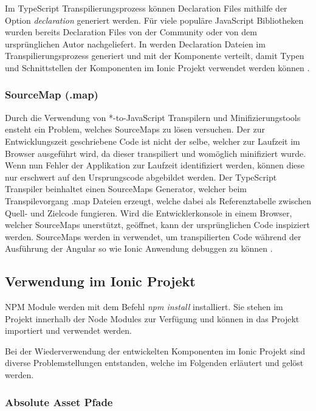 Im TypeScript Transpilierungsprozess können Declaration Files mithilfe der Option \emph{declaration} generiert werden.
Für viele populäre JavaScript Bibliotheken wurden bereits Declaration Files von der Community oder von dem ursprünglichen Autor nachgeliefert.
In \projectname{} werden Declaration Dateien im Transpilierungsprozess generiert und mit der Komponente verteilt,
damit Typen und Schnittstellen der Komponenten im Ionic Projekt verwendet werden können \cite[471]{EssentialTS}.


\subsubsection{SourceMap (.map)}
Durch die Verwendung von *-to-JavaScript Transpilern und Minifizierungstools ensteht ein Problem, welches SourceMaps zu lösen versuchen.
Der zur Entwicklungszeit geschriebene Code ist nicht der selbe, welcher zur Laufzeit im Browser ausgeführt wird, da dieser transpiliert und womöglich minifiziert wurde.
Wenn nun Fehler der Applikation zur Laufzeit identifiziert werden, können diese nur erschwert auf den Ursprungscode abgebildet werden.
Der TypeScript Transpiler beinhaltet einen SourceMaps Generator, welcher beim Transpilevorgang .map Dateien erzeugt,
welche dabei als Referenztabelle zwischen Quell- und Zielcode fungieren.
Wird die Entwicklerkonsole in einem Browser, welcher SourceMaps unerstützt, geöffnet, kann der ursprünglichen Code inspiziert werden.
SourceMaps werden in \projectname{} verwendet, um transpilierten Code während der Ausführung der Angular so wie Ionic Anwendung debuggen zu können
 \cite{Using97:online}.



\subsection{Verwendung im Ionic Projekt}
\ac{NPM} Module werden mit dem Befehl \emph{npm install} installiert.
Sie stehen im Projekt innerhalb der Node Modules zur Verfügung und können in das Projekt importiert und verwendet werden.

Bei der Wiederverwendung der entwickelten Komponenten im Ionic Projekt sind diverse Problemstellungen entstanden,
welche im Folgenden erläutert und gelöst werden.

\subsubsection{Absolute Asset Pfade}
\label{Absolute-Asset-Pfade}

